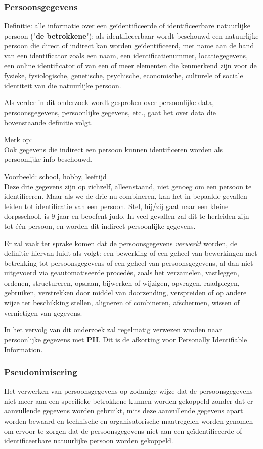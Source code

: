 \subsubsection{Persoonsgegevens} 
Definitie: alle informatie over een geïdentificeerde of identificeerbare natuurlijke persoon ("\textbf{de betrokkene}"); als identificeerbaar wordt beschouwd een natuurlijke persoon die direct of indirect kan worden geïdentificeerd, met name aan de hand van een identificator zoals een naam, een identificatienummer, locatiegegevens, een online identificator of van een of meer elementen die kenmerkend zijn voor de fysieke, fysiologische, genetische, psychische, economische, culturele of sociale identiteit van die natuurlijke persoon.

 Als verder in dit onderzoek wordt gesproken over persoonlijke data, persoonsgegevens, persoonlijke gegevens, etc., gaat het over data die bovenstaande definitie volgt.
 
  Merk op:
  \\ Ook gegevens die indirect een persoon kunnen identificeren worden als persoonlijke info beschouwd. 
 
 Voorbeeld: school, hobby, leeftijd
 \\ Deze drie gegevens zijn op zichzelf, alleenstaand, niet genoeg om een persoon te identificeren.
 Maar als we de drie nu combineren, kan het in bepaalde gevallen leiden tot identificatie van een persoon. Stel, hij/zij gaat naar een kleine dorpsschool, is 9 jaar en beoefent judo. In veel gevallen zal dit te herleiden zijn tot één persoon, en worden dit indirect persoonlijke gegevens. 

Er zal vaak ter sprake komen dat de persoonsgegevens \underline{\textit{verwerkt}} worden, de definitie hiervan luidt als volgt: een bewerking of een geheel van bewerkingen met betrekking tot persoonsgegevens of een geheel van persoonsgegevens, al dan niet uitgevoerd via geautomatiseerde procedés, zoals het verzamelen, vastleggen, ordenen, structureren, opslaan, bijwerken of wijzigen, opvragen, raadplegen, gebruiken, verstrekken door middel van doorzending, verspreiden of op andere wijze ter beschikking stellen, aligneren of combineren, afschermen, wissen of vernietigen van gegevens.

In het vervolg van dit onderzoek zal regelmatig verwezen wroden naar persoonlijke gegevens met \textbf{PII}. Dit is de afkorting voor Personally Identifiable Information.

\subsubsection{Pseudonimisering} 
Het verwerken van persoonsgegevens op zodanige wijze dat de persoonsgegevens niet meer aan een specifieke betrokkene kunnen worden gekoppeld zonder dat er aanvullende gegevens worden gebruikt, mits deze aanvullende gegevens apart worden bewaard en technische en organisatorische maatregelen worden genomen om ervoor te zorgen dat de persoonsgegevens niet aan een geïdentificeerde of identificeerbare natuurlijke persoon worden gekoppeld. 

